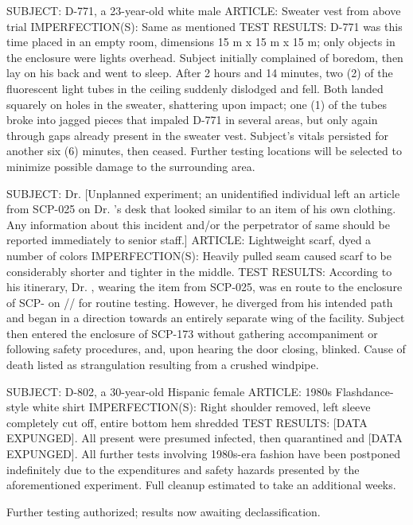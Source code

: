 \begin{leftbar}
SUBJECT: D-771, a 23-year-old white male
ARTICLE: Sweater vest from above trial
IMPERFECTION(S): Same as mentioned
TEST RESULTS: D-771 was this time placed in an empty room, dimensions 15 m x 15 m x 15 m; only objects in the enclosure were lights overhead. Subject initially complained of boredom, then lay on his back and went to sleep. After 2 hours and 14 minutes, two (2) of the fluorescent light tubes in the ceiling suddenly dislodged and fell. Both landed squarely on holes in the sweater, shattering upon impact; one (1) of the tubes broke into jagged pieces that impaled D-771 in several areas, but only again through gaps already present in the sweater vest. Subject's vitals persisted for another six (6) minutes, then ceased. Further testing locations will be selected to minimize possible damage to the surrounding area.

SUBJECT: Dr.  [Unplanned experiment; an unidentified individual left an article from SCP-025 on Dr. 's desk that looked similar to an item of his own clothing. Any information about this incident and/or the perpetrator of same should be reported immediately to senior staff.]
ARTICLE: Lightweight scarf, dyed a number of colors
IMPERFECTION(S): Heavily pulled seam caused scarf to be considerably shorter and tighter in the middle.
TEST RESULTS: According to his itinerary, Dr. , wearing the item from SCP-025, was en route to the enclosure of SCP- on // for routine testing. However, he diverged from his intended path and began in a direction towards an entirely separate wing of the facility. Subject then entered the enclosure of SCP-173 without gathering accompaniment or following safety procedures, and, upon hearing the door closing, blinked. Cause of death listed as strangulation resulting from a crushed windpipe.

SUBJECT: D-802, a 30-year-old Hispanic female
ARTICLE: 1980s Flashdance-style white shirt
IMPERFECTION(S): Right shoulder removed, left sleeve completely cut off, entire bottom hem shredded
TEST RESULTS: [DATA EXPUNGED]. All present were presumed infected, then quarantined and [DATA EXPUNGED].
All further tests involving 1980s-era fashion have been postponed indefinitely due to the expenditures and safety hazards presented by the aforementioned experiment. Full cleanup estimated to take an additional  weeks.
\end{leftbar}

Further testing authorized; results now awaiting declassification.